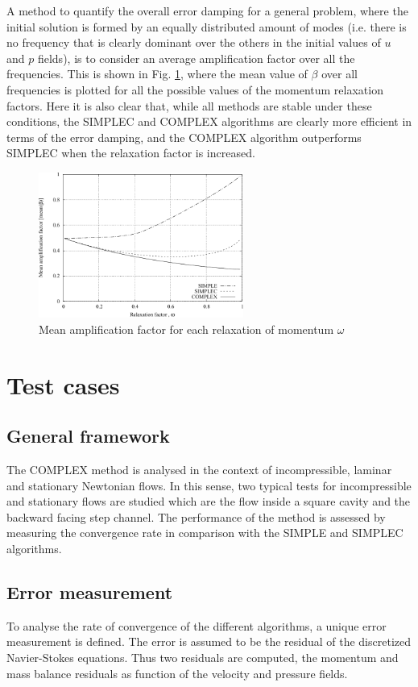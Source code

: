 \documentclass[final,3p,times,10pt,onecolumn]{myElsarticle}
\numberwithin{equation}{section}
\begin{document}
A method to quantify the overall error damping for a general problem, where the initial solution is formed by an equally distributed amount of modes (i.e. there is no frequency that is clearly dominant over the others in the initial values of $u$ and $p$ fields), is to consider an average amplification factor over all the frequencies. This is shown in Fig. \ref{fig:1d}, where the mean value of $\beta$ over all frequencies is plotted for all the possible values of the momentum relaxation factors. Here it is also clear that, while all methods are stable under these conditions, the SIMPLEC and COMPLEX algorithms are clearly more efficient in terms of the error damping, and the COMPLEX algorithm outperforms SIMPLEC when the relaxation factor is increased. 

\begin{figure}[H]
    \centering
    \includegraphics[width=0.6\textwidth]{fig/meanAmp}
    \caption{Mean amplification factor for each relaxation of momentum $\omega$}
    \label{fig:1d}
\end{figure}  

\section{Test cases}
\label{sec:cases}

\subsection{General framework}
The COMPLEX method is analysed in the context of incompressible, laminar and stationary Newtonian flows. In this sense, two typical tests for incompressible and stationary flows are studied which are the flow inside a square cavity and the backward facing step channel. The performance of the method is assessed by measuring the convergence rate in comparison with the SIMPLE and SIMPLEC algorithms.

\subsection{Error measurement}
To analyse the rate of convergence of the different algorithms, a unique error measurement is defined. The error is assumed to be the residual of the discretized Navier-Stokes equations. Thus two residuals are computed, the momentum and mass balance residuals as function of the velocity and pressure fields. 
\end{document}
